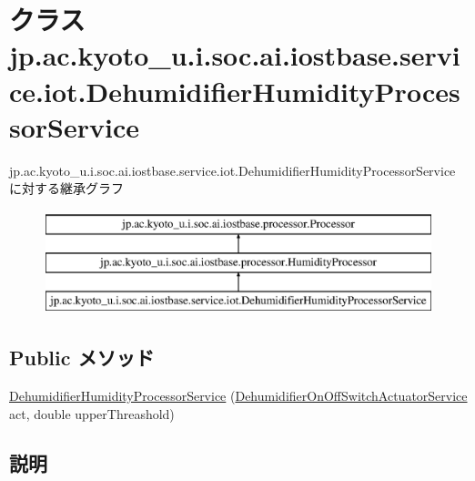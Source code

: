 \hypertarget{classjp_1_1ac_1_1kyoto__u_1_1i_1_1soc_1_1ai_1_1iostbase_1_1service_1_1iot_1_1_dehumidifier_humidity_processor_service}{\section{クラス jp.\-ac.\-kyoto\-\_\-u.\-i.\-soc.\-ai.\-iostbase.\-service.\-iot.\-Dehumidifier\-Humidity\-Processor\-Service}
\label{classjp_1_1ac_1_1kyoto__u_1_1i_1_1soc_1_1ai_1_1iostbase_1_1service_1_1iot_1_1_dehumidifier_humidity_processor_service}
}
jp.\-ac.\-kyoto\-\_\-u.\-i.\-soc.\-ai.\-iostbase.\-service.\-iot.\-Dehumidifier\-Humidity\-Processor\-Serviceに対する継承グラフ\begin{figure}[H]
\begin{center}
\leavevmode
\includegraphics[height=3.000000cm]{classjp_1_1ac_1_1kyoto__u_1_1i_1_1soc_1_1ai_1_1iostbase_1_1service_1_1iot_1_1_dehumidifier_humidity_processor_service}
\end{center}
\end{figure}
\subsection*{Public メソッド}
\begin{DoxyCompactItemize}
\item 
\hyperlink{classjp_1_1ac_1_1kyoto__u_1_1i_1_1soc_1_1ai_1_1iostbase_1_1service_1_1iot_1_1_dehumidifier_humidity_processor_service_a7e0727957ef8f2a3b68380c733c768fe}{Dehumidifier\-Humidity\-Processor\-Service} (\hyperlink{classjp_1_1ac_1_1kyoto__u_1_1i_1_1soc_1_1ai_1_1iostbase_1_1service_1_1iot_1_1_dehumidifier_on_off_switch_actuator_service}{Dehumidifier\-On\-Off\-Switch\-Actuator\-Service} act, double upper\-Threashold)
\end{DoxyCompactItemize}


\subsection{説明}


